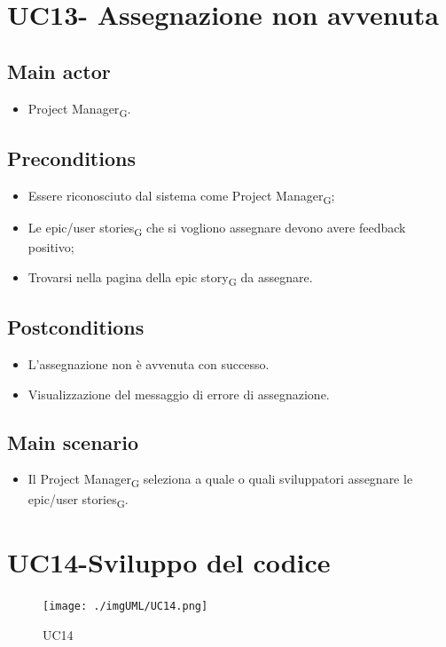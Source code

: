 \documentclass{article}
\begin{document}
\section{UC13- Assegnazione non avvenuta}

       \subsection*{Main actor}
    \begin{itemize}
        \item Project Manager\textsubscript{G}.
    \end{itemize}
    
    \subsection*{Preconditions}
        \begin{itemize}
            \item Essere riconosciuto dal sistema come Project Manager\textsubscript{G};
            \item Le epic/user stories\textsubscript{G} che si vogliono assegnare devono avere feedback positivo;
            \item Trovarsi nella pagina della epic story\textsubscript{G} da assegnare.
        \end{itemize}
        
    \subsection*{Postconditions}
        \begin{itemize}
            \item L'assegnazione non è avvenuta con successo.
            \item Visualizzazione del messaggio di errore di assegnazione.
        \end{itemize}

    \subsection*{Main scenario}
    \begin{itemize}
        \item Il Project Manager\textsubscript{G} seleziona a quale o quali sviluppatori assegnare le epic/user stories\textsubscript{G}.
    \end{itemize}
    
\section{UC14-Sviluppo del codice}
    \begin{figure}[h]
      \centering
      \texttt{[image: ./imgUML/UC14.png]}
    \caption{UC14}
      \label{fig:UC14}
    \end{figure}
    
\end{document}
